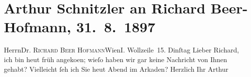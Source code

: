 

         
         \renewcommand{\erwaehntePersonen}{Personen: Richard Beer-Hofmann}
         \renewcommand{\erwaehnteOrte}{Orte: Café Arkaden, I., Innere Stadt, VIII., Josefstadt, Wien, Wollzeile}
         \renewcommand{\erwaehnteWerke}{}
               \section[Arthur Schnitzler an Richard Beer-Hofmann, 31. 8. 1897]{ Arthur Schnitzler an Richard Beer-Hofmann, 31. 8. 1897}\nopagebreak{}\rehead{ }\begin{ledgroupsized}[t]{13cm}\normalsize\beginnumbering \toendnotes[C]{\smallbreak\pagebreak[2]} 
\pstart{}{\pb}Herrn\pend{}\pstart{}Dr. \textsc{Richard Beer Hofmann}\pend{}\pstart{}Wien\pend{}\pstart{}I. Wollzeile 15.\pend{}{\bigskip}\pstart
           \raggedleft{}{\pb}Dinſtag\pend
           \pstart{}Lieber Richard,\pend\pstart
           ich bin heut früh angeko{\geminationm}en; wieſo haben wir gar
                    keine Nachricht von Ihnen gehabt?\pend
           \pstart
           Vielleicht ſeh ich Sie heut Abend im Arkaden?\pend
           \pstart {\pb}Herzlich Ihr \spacefill\mbox{Arthur}\pend{}
         
         \endnumbering{}\end{ledgroupsized}  \newcommand{\dateiname}{L00719}\newcommand{\titel}{Arthur Schnitzler an Richard Beer-Hofmann, 31. 8. 1897}\newcommand{\editorInnen}{ Martin Anton Müller und Gerd-Hermann Susen}
      